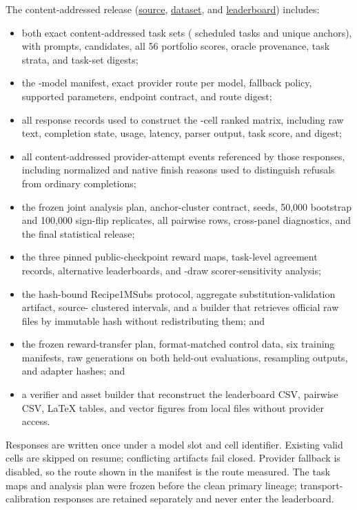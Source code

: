 \documentclass[10pt,twocolumn]{article}
\begin{document}
The content-addressed release
(\href{https://github.com/josefchen/flavourbench}{source},
\href{https://huggingface.co/datasets/josefchen/flavourbench}{dataset}, and
\href{https://huggingface.co/spaces/josefchen/flavourbench}{leaderboard}) includes:
\begin{itemize}
  \item both exact content-addressed task sets (\FBTasks{} scheduled tasks and
  \FBUniqueAnchors{} unique anchors), with prompts, candidates, all 56 portfolio scores, oracle
  provenance, task strata, and task-set digests;
  \item the \FBModels{}-model manifest, exact provider route per model, fallback policy, supported
  parameters, endpoint contract, and route digest;
  \item all response records used to construct the \FBCompleteCells{}-cell ranked matrix,
  including raw text, completion state, usage, latency, parser output, task score, and digest;
  \item all content-addressed provider-attempt events referenced by those responses, including
  normalized and native finish reasons used to distinguish refusals from ordinary completions;
  \item the frozen joint analysis plan, anchor-cluster contract, seeds, 50,000 bootstrap and
  100,000 sign-flip replicates, all \FBPairs{} pairwise rows, cross-panel diagnostics, and the final
  statistical release;
  \item the three pinned public-checkpoint reward maps, task-level agreement records, alternative
  leaderboards, and \FBPublicScorerReplicates{}-draw scorer-sensitivity analysis;
  \item the hash-bound Recipe1MSubs protocol, aggregate substitution-validation artifact, source-
  clustered intervals, and a builder that retrieves official raw files by immutable hash without
  redistributing them; and
  \item the frozen reward-transfer plan, format-matched control data, six training manifests,
  raw generations on both held-out evaluations, resampling outputs, and adapter hashes; and
  \item a verifier and asset builder that reconstruct the leaderboard CSV, pairwise CSV, LaTeX
  tables, and vector figures from local files without provider access.
\end{itemize}

Responses are written once under a model slot and cell identifier. Existing valid cells are
skipped on resume; conflicting artifacts fail closed. Provider fallback is disabled, so the route
shown in the manifest is the route measured. The task maps and analysis plan were frozen before
the clean primary lineage; transport-calibration responses are retained separately and never enter
the leaderboard.
\end{document}
